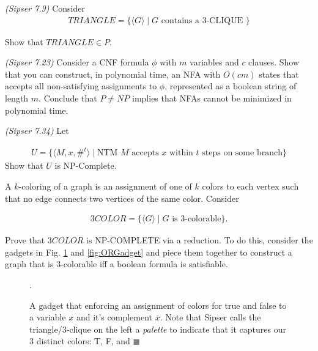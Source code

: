 \documentclass{exam}
\theoremstyle{definition}
\begin{document}
\begin{questions}
    \question \textit{(Sipser 7.9)} Consider 
    \begin{align*}
        TRIANGLE = \{\langle G \rangle \mid G \text{ contains a 3-CLIQUE }\}
    \end{align*}

    Show that $TRIANGLE \in P$. 

    \question \textit{(Sipser 7.23)} Consider a CNF formula $\phi$ with $m$ variables and $c$ clauses. Show that you can construct, in polynomial time,  an NFA with $O(cm)$ states that accepts all non-satisfying assignments to $\phi$, represented as a boolean string of length $m$. Conclude that $P \neq NP$ implies that NFAs cannot be minimized in polynomial time. 

    \question \textit{(Sipser 7.34)} Let 

    \begin{align*}
        U = \{\langle M, x, \#^t \rangle \mid \text{NTM $M$ accepts $x$ within $t$ steps on some branch} \}
    \end{align*}
    Show that $U$ is NP-Complete.  

    \question A $k$-coloring of a graph is an assignment of one of $k$ colors to each vertex such that no edge connects two vertices of the same color. Consider

    \begin{align*}
        3COLOR = \{\langle G \rangle \mid G \text{ is 3-colorable} \}.
    \end{align*}

    Prove that $3COLOR$ is NP-COMPLETE via a reduction. To do this, consider the gadgets in Fig. \ref{fig:TFGadget} and \ref{fig:ORGadget} and piece them together to construct a graph that is 3-colorable iff a boolean formula is satisfiable. 

    \begin{figure}
        \centering
        \caption{A gadget that enforcing an assignment of colors for true and false to a variable $x$ and it's complement $\overline{x}$. Note that Sipser calls the triangle/3-clique on the left a \textit{palette} to indicate that it captures our 3 distinct colors: T, F, and \textcolor{gray}{$\blacksquare$}}.
        \label{fig:TFGadget}
    \end{figure}


\end{questions}
\end{document}
